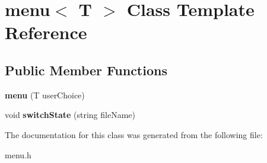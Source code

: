 \hypertarget{classmenu}{}\section{menu$<$ T $>$ Class Template Reference}
\label{classmenu}
\subsection*{Public Member Functions}
\begin{DoxyCompactItemize}
\item 
\mbox{\label{classmenu_a1ba608803dbd7d3eb5d5f0c7dd58a9f3}} 
{\bfseries menu} (T user\+Choice)
\item 
\mbox{\label{classmenu_a8e08b2e3fc808c3c1ceca32234d2496b}} 
void {\bfseries switch\+State} (string file\+Name)
\end{DoxyCompactItemize}


The documentation for this class was generated from the following file\+:\begin{DoxyCompactItemize}
\item 
menu.\+h\end{DoxyCompactItemize}
